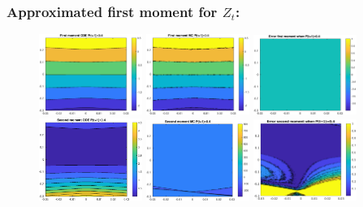 \documentclass[aspectratio=169]{beamer}\usepackage[utf8]{inputenc}
\begin{document}
\begin{frame}\frametitle{Approximated first moment for $Z_t$:}

\begin{figure}[ht!]
\centering
\includegraphics[width=0.3\textwidth]{../../MATLAB_Files/Results/moments/lamperti/errors/fm_ODE_3.eps}\quad
\includegraphics[width=0.3\textwidth]{../../MATLAB_Files/Results/moments/lamperti/errors/fm_MC_3.eps}\quad
\includegraphics[width=0.3\textwidth]{../../MATLAB_Files/Results/moments/lamperti/errors/fm_3.eps}\quad
\includegraphics[width=0.3\textwidth]{../../MATLAB_Files/Results/moments/lamperti/errors/sm_ODE_3.eps}\quad
\includegraphics[width=0.3\textwidth]{../../MATLAB_Files/Results/moments/lamperti/errors/sm_MC_3.eps}\quad
\includegraphics[width=0.3\textwidth]{../../MATLAB_Files/Results/moments/lamperti/errors/sm_3.eps}
\end{figure}

\end{frame}
\end{document}
